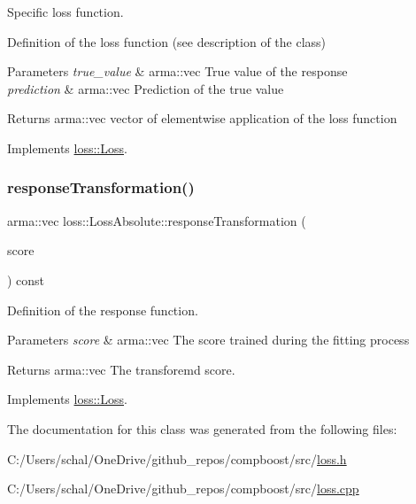 Specific loss function. 

Definition of the loss function (see description of the class)


\begin{DoxyParams}{Parameters}
{\em true\+\_\+value} & {\ttfamily arma\+::vec} True value of the response \\
\hline
{\em prediction} & {\ttfamily arma\+::vec} Prediction of the true value\\
\hline
\end{DoxyParams}
\begin{DoxyReturn}{Returns}
{\ttfamily arma\+::vec} vector of elementwise application of the loss function 
\end{DoxyReturn}


Implements \mbox{\hyperlink{classloss_1_1_loss_ae9f94dd9b8311397583ba3a9cb485e94}{loss\+::\+Loss}}.

\mbox{\label{classloss_1_1_loss_absolute_a490d0fdab3e1af9cddbca77b8170263a}} 
\subsubsection{\texorpdfstring{response\+Transformation()}{responseTransformation()}}
{\footnotesize\ttfamily arma\+::vec loss\+::\+Loss\+Absolute\+::response\+Transformation (\begin{DoxyParamCaption}\item[{const arma\+::vec \&}]{score }\end{DoxyParamCaption}) const\hspace{0.3cm}{\ttfamily [virtual]}}



Definition of the response function. 


\begin{DoxyParams}{Parameters}
{\em score} & {\ttfamily arma\+::vec} The score trained during the fitting process\\
\hline
\end{DoxyParams}
\begin{DoxyReturn}{Returns}
{\ttfamily arma\+::vec} The transforemd score. 
\end{DoxyReturn}


Implements \mbox{\hyperlink{classloss_1_1_loss_a0a84b7df79b08e40b538aaa7e6ee75c4}{loss\+::\+Loss}}.



The documentation for this class was generated from the following files\+:\begin{DoxyCompactItemize}
\item 
C\+:/\+Users/schal/\+One\+Drive/github\+\_\+repos/compboost/src/\mbox{\hyperlink{loss_8h}{loss.\+h}}\item 
C\+:/\+Users/schal/\+One\+Drive/github\+\_\+repos/compboost/src/\mbox{\hyperlink{loss_8cpp}{loss.\+cpp}}\end{DoxyCompactItemize}
